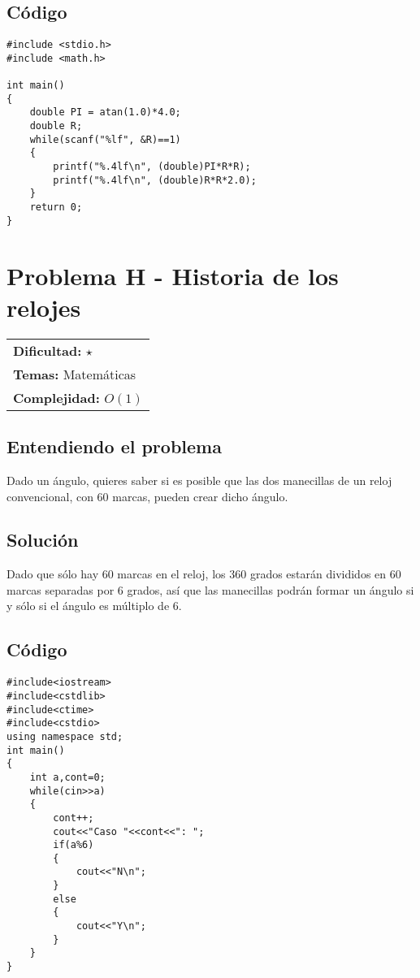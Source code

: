 \subsection*{Código}

\begin{verbatim}
#include <stdio.h>
#include <math.h>
 
int main()
{
    double PI = atan(1.0)*4.0;
    double R;
    while(scanf("%lf", &R)==1)
    {
        printf("%.4lf\n", (double)PI*R*R);
        printf("%.4lf\n", (double)R*R*2.0);
    }
    return 0;
}
\end{verbatim}

\section{Problema H - Historia de los relojes}

\hfill
\begin{tabular}{@{}l@{}}
\textbf{Dificultad:} $\star$ \\
\textbf{Temas:} Matemáticas \\
\textbf{Complejidad:} $O(1)$
\end{tabular}

\subsection*{Entendiendo el problema}
Dado un ángulo, quieres saber si es posible que las dos manecillas de un reloj convencional, con 60 marcas, pueden crear dicho ángulo.
\subsection*{Solución}
Dado que sólo hay 60 marcas en el reloj, los 360 grados estarán divididos en 60 marcas separadas por 6 grados, así que las manecillas podrán formar un ángulo si y sólo si el ángulo es múltiplo de 6.
\subsection*{Código}

\begin{verbatim}
#include<iostream>
#include<cstdlib>
#include<ctime>
#include<cstdio>
using namespace std;
int main()
{
    int a,cont=0;
    while(cin>>a)
    {
        cont++;
        cout<<"Caso "<<cont<<": ";
        if(a%6)
        {
            cout<<"N\n";
        }
        else
        {
            cout<<"Y\n";
        }
    }
}
\end{verbatim}

